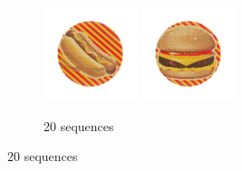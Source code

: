 \documentclass{article}
\begin{document}
\begin{figure}[ht!]
\begin{subfigure}[t]{0.4\textwidth}
\includegraphics[width=0.3\textwidth]{images/reduction/20/sim0.png}
\includegraphics[width=0.3\textwidth]{images/reduction/20/sim1.png}
\caption{20 sequences}
\end{subfigure}



\end{figure}
\end{document}
